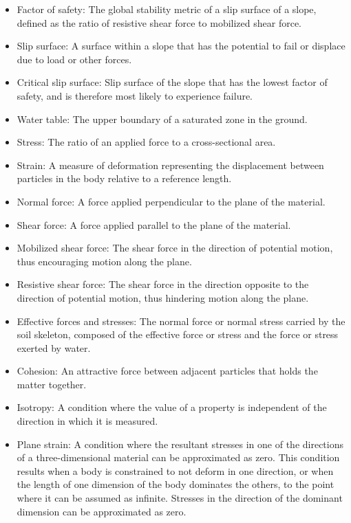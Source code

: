 \documentclass[12pt]{article}
\begin{document}
\begin{itemize}
\item{Factor of safety: The global stability metric of a slip surface of a slope, defined as the ratio of resistive shear force to mobilized shear force.}
\item{Slip surface: A surface within a slope that has the potential to fail or displace due to load or other forces.}
\item{Critical slip surface: Slip surface of the slope that has the lowest factor of safety, and is therefore most likely to experience failure.}
\item{Water table: The upper boundary of a saturated zone in the ground.}
\item{Stress: The ratio of an applied force to a cross-sectional area.}
\item{Strain: A measure of deformation representing the displacement between particles in the body relative to a reference length.}
\item{Normal force: A force applied perpendicular to the plane of the material.}
\item{Shear force: A force applied parallel to the plane of the material.}
\item{Mobilized shear force: The shear force in the direction of potential motion, thus encouraging motion along the plane.}
\item{Resistive shear force: The shear force in the direction opposite to the direction of potential motion, thus hindering motion along the plane.}
\item{Effective forces and stresses: The normal force or normal stress carried by the soil skeleton, composed of the effective force or stress and the force or stress exerted by water.}
\item{Cohesion: An attractive force between adjacent particles that holds the matter together.}
\item{Isotropy: A condition where the value of a property is independent of the direction in which it is measured.}
\item{Plane strain: A condition where the resultant stresses in one of the directions of a three-dimensional material can be approximated as zero. This condition results when a body is constrained to not deform in one direction, or when the length of one dimension of the body dominates the others, to the point where it can be assumed as infinite. Stresses in the direction of the dominant dimension can be approximated as zero.}
\end{itemize}
\end{document}
